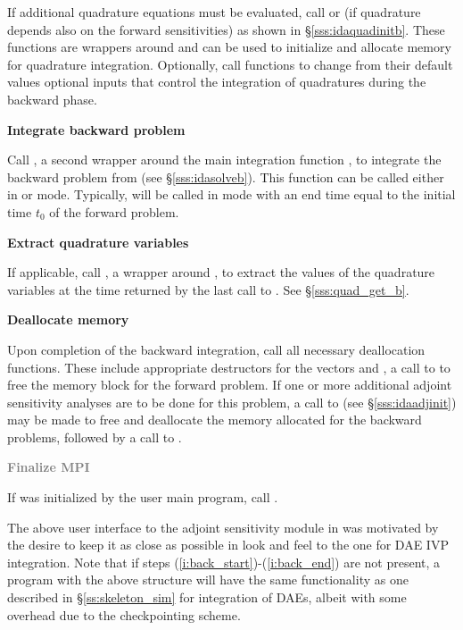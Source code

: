 \begin{Steps}
  If additional quadrature equations must be evaluated, 
  call  or  (if quadrature depends also on the
  forward sensitivities) as shown in \S\ref{sss:idaquadinitb}. These functions are
  wrappers around  and can be used to initialize and allocate 
  memory for quadrature integration. Optionally, call  functions 
  to change from their default values optional inputs that control the integration 
  of quadratures during the backward phase.

\item
  {\bf Integrate backward problem}

  Call , a second wrapper around the {\idas} main integration
  function , to integrate the backward problem from 
  (see \S\ref{sss:idasolveb}). This function can be called either in 
  or  mode. Typically,  will be called in 
  mode with an end time equal to the initial time $t_0$ of the forward problem.

\item \label{i:back_end}
  {\bf Extract quadrature variables}

  If applicable, call , a wrapper around ,
  to extract the values of the quadrature variables at the time returned
  by the last call to .  See \S\ref{sss:quad_get_b}.

\item
  {\bf Deallocate memory}

  Upon completion of the backward integration, call all necessary deallocation
  functions. These include appropriate destructors for the vectors  and
  , a call to  to free the {\idas} memory block for the
  forward problem.  If one or more additional adjoint sensitivity analyses are to
  be done for this problem, a call to  (see \S\ref{sss:idaadjinit})
  may be made to free and deallocate the memory allocated for the backward problems,
  followed by a call to .

\item
  \textcolor{gray}{\bf Finalize MPI}

  {\p} If {\mpi} was initialized by the user main program, call .

\end{Steps}

The above user interface to the adjoint sensitivity module in {\idas} was motivated by
the desire to keep it as close as possible in look and feel to the one for DAE IVP 
integration. Note that if steps (\ref{i:back_start})-(\ref{i:back_end}) are not present, 
a program with the above structure will have the same functionality as one described in
\S\ref{ss:skeleton_sim} for integration of DAEs, albeit with some overhead due to 
the checkpointing scheme.


